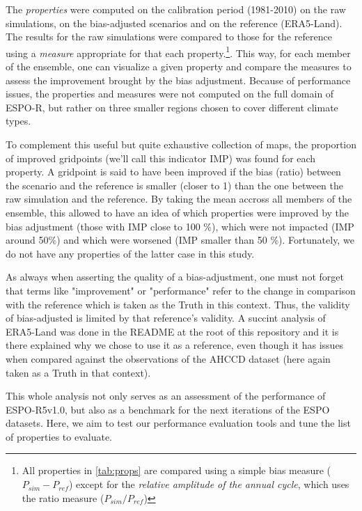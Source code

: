 \documentclass[letterpaper,10pt]{article}
\begin{document}
The \emph{properties} were computed on the calibration period (1981-2010) on the raw simulations, on the bias-adjusted scenarios and on the reference (ERA5-Land). The results for the raw simulations were compared to those for the reference using a \emph{measure} appropriate for that each property.\footnote{All properties in \ref{tab:props} are compared using a simple bias measure ($P_{sim} - P_{ref}$) except for the \emph{relative amplitude of the annual cycle}, which uses the ratio measure ($P_{sim} / P_{ref}$)}. This way, for each member of the ensemble, one can visualize a given property and compare the measures to assess the improvement brought by the bias adjustment. Because of performance issues, the properties and measures were not computed on the full domain of ESPO-R, but rather on three smaller regions chosen to cover different climate types.

To complement this useful but quite exhaustive collection of maps, the proportion of improved gridpoints (we'll call this indicator IMP) was found for each property. A gridpoint is said to have been improved if the bias (ratio) between the scenario and the reference is smaller (closer to 1) than the one between the raw simulation and the reference. By taking the mean accross all members of the ensemble, this allowed to have an idea of which properties were improved by the bias adjustment (those with IMP close to 100 \%), which were not impacted (IMP around 50\%) and which were worsened (IMP smaller than 50 \%). Fortunately, we do not have any properties of the latter case in this study.

As always when asserting the quality of a bias-adjustment, one must not forget that terms like "improvement" or "performance" refer to the change in comparison with the reference which is taken as the Truth in this context. Thus, the validity of bias-adjusted is limited by that reference's validity. A succint analysis of ERA5-Land was done in the README at the root of this repository and it is there explained why we chose to use it as a reference, even though it has issues when compared against the observations of the AHCCD dataset (here again taken as a Truth in that context).

This whole analysis not only serves as an assessment of the performance of ESPO-R5v1.0, but also as a benchmark for the next iterations of the ESPO datasets. Here, we aim to test our performance evaluation tools and tune the list of properties to evaluate.
\end{document}
